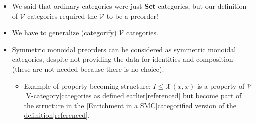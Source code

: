 \begin{itemize}
    \item We said that ordinary categories were just \textbf{Set}-categories, but our definition of $\mathcal{V}$ categories required the $\mathcal{V}$ to be a preorder!
    \item We have to generalize (categorify) $\mathcal{V}$ categories.
    \item Symmetric monoidal preorders can be considered as symmetric monoidal categories, despite not providing the data for identities and composition (these are not needed because there is no choice).
          \begin{itemize}
            \item Example of property becoming structure: $I \leq \mathcal{X}(x,x)$ is a property of $\mathcal{V}$ \ref{V-category|categories as defined earlier|referenced} but become part of the structure in the \ref{Enrichment in a SMC|categorified version of the definition|referenced}.
          \end{itemize}

  \end{itemize}

